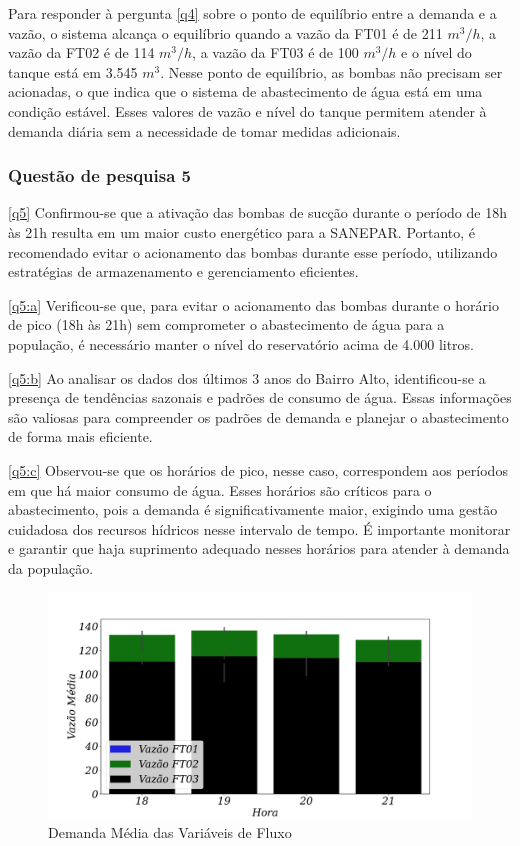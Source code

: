 Para responder à pergunta \ref{q4} sobre o ponto de equilíbrio entre a demanda e a vazão, o sistema alcança o equilíbrio quando a vazão da FT01 é de 211 $m^3/h$, a vazão da FT02 é de 114 $m^3/h$, a vazão da FT03 é de 100 $m^3/h$ e o nível do tanque está em 3.545 $m^3$. Nesse ponto de equilíbrio, as bombas não precisam ser acionadas, o que indica que o sistema de abastecimento de água está em uma condição estável. Esses valores de vazão e nível do tanque permitem atender à demanda diária sem a necessidade de tomar medidas adicionais.


\subsubsection{Quest\~ao de pesquisa 5}

\ref{q5} Confirmou-se que a ativação das bombas de sucção durante o período de 18h às 21h resulta em um maior custo energético para a SANEPAR. Portanto, é recomendado evitar o acionamento das bombas durante esse período, utilizando estratégias de armazenamento e gerenciamento eficientes.

\ref{q5:a} Verificou-se que, para evitar o acionamento das bombas durante o horário de pico (18h às 21h) sem comprometer o abastecimento de água para a população, é necessário manter o nível do reservatório acima de 4.000 litros.

\ref{q5:b} Ao analisar os dados dos últimos 3 anos do Bairro Alto, identificou-se a presença de tendências sazonais e padrões de consumo de água. Essas informações são valiosas para compreender os padrões de demanda e planejar o abastecimento de forma mais eficiente.

\ref{q5:c} Observou-se que os horários de pico, nesse caso, correspondem aos períodos em que há maior consumo de água. Esses horários são críticos para o abastecimento, pois a demanda é significativamente maior, exigindo uma gestão cuidadosa dos recursos hídricos nesse intervalo de tempo. É importante monitorar e garantir que haja suprimento adequado nesses horários para atender à demanda da população.



\begin{figure}[!htpb]
	\centering
	\caption{Demanda Média das Variáveis de Fluxo}
	\includegraphics[width=0.9\linewidth]{Resultados/Figuras/grafico-barras-demanda}
	
	\label{fig:grafico-barras-demanda}
	
\end{figure}

